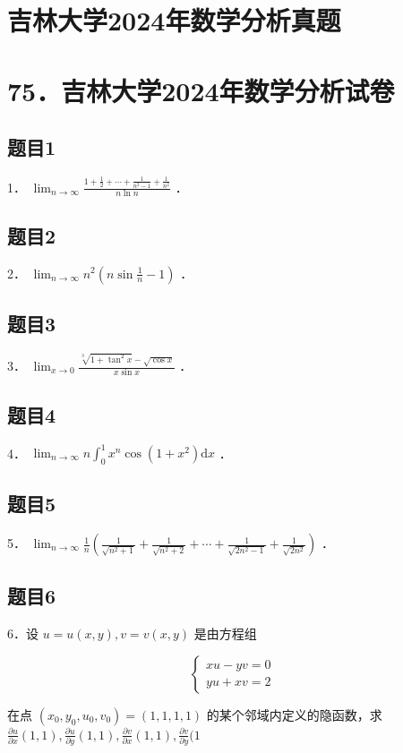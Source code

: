 \documentclass{article}
\begin{document}
\section*{吉林大学2024年数学分析真题}
\section*{75．吉林大学2024年数学分析试卷}

\subsection{题目1}
1． \(\lim _{n \rightarrow \infty} \frac{1+\frac{1}{2}+\cdots+\frac{1}{n^{2}-1}+\frac{1}{n^{2}}}{n \ln n}\) ．

\subsection{题目2}
2． \(\lim _{n \rightarrow \infty} n^{2}\left(n \sin \frac{1}{n}-1\right)\) ．

\subsection{题目3}
3． \(\lim _{x \rightarrow 0} \frac{\sqrt[3]{1+\tan ^{2} x}-\sqrt{\cos x}}{x \sin x}\) ．

\subsection{题目4}
4． \(\lim _{n \rightarrow \infty} n \int_{0}^{1} x^{n} \cos \left(1+x^{2}\right) \mathrm{d} x\) ．

\subsection{题目5}
5． \(\lim _{n \rightarrow \infty} \frac{1}{n}\left(\frac{1}{\sqrt{n^{2}+1}}+\frac{1}{\sqrt{n^{2}+2}}+\cdots+\frac{1}{\sqrt{2 n^{2}-1}}+\frac{1}{\sqrt{2 n^{2}}}\right)\) ．

\subsection{题目6}
6．设 \(u=u(x, y), v=v(x, y)\) 是由方程组

\[
\left\{\begin{array}{l}
x u-y v=0 \\
y u+x v=2
\end{array}\right.
\]

在点 \(\left(x_{0}, y_{0}, u_{0}, v_{0}\right)=(1,1,1,1)\) 的某个邻域内定义的隐函数，求 \(\frac{\partial u}{\partial x}(1,1), \frac{\partial u}{\partial y}(1,1), \frac{\partial v}{\partial x}(1,1), \frac{\partial v}{\partial y}(1\)
\end{document}
